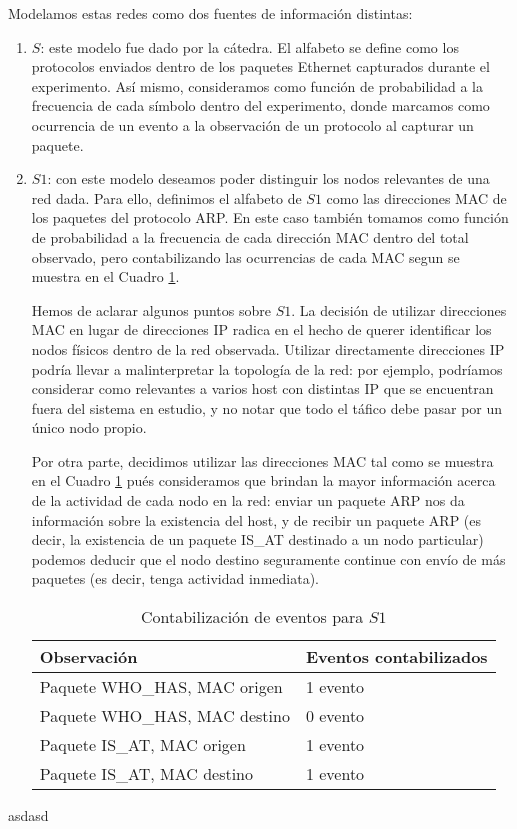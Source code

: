 Modelamos estas redes como dos fuentes de información distintas:
\begin{enumerate}
	\item $S$: este modelo fue dado por la cátedra. El alfabeto se define como los protocolos enviados dentro de los paquetes Ethernet capturados durante el experimento. Así mismo, consideramos como función de probabilidad a la frecuencia de cada símbolo dentro del experimento, donde marcamos como ocurrencia de un evento a la observación de un protocolo al capturar un paquete.
	\item $S1$: con este modelo deseamos poder distinguir los nodos relevantes de una red dada. Para ello, definimos el alfabeto de $S1$ como las direcciones MAC de los paquetes del protocolo ARP. En este caso también tomamos como función de probabilidad a la frecuencia de cada dirección MAC dentro del total observado, pero contabilizando las ocurrencias de cada MAC segun se muestra en el Cuadro \ref{ARP}.
	
Hemos de aclarar algunos puntos sobre $S1$. La decisión de utilizar direcciones MAC en lugar de direcciones IP radica en el hecho de querer identificar los nodos físicos dentro de la red observada. Utilizar directamente direcciones IP podría llevar a malinterpretar la topología de la red: por ejemplo, podríamos considerar como relevantes a varios host con distintas IP que se encuentran fuera del sistema en estudio, y no notar que todo el táfico debe pasar por un único nodo propio.

Por otra parte, decidimos utilizar las direcciones MAC tal como se muestra en el Cuadro \ref{ARP} pués consideramos que brindan la mayor información acerca de la actividad de cada nodo en la red: enviar un paquete ARP nos da información sobre la existencia del host, y de recibir un paquete ARP (es decir, la existencia de un paquete IS\_AT destinado a un nodo particular) podemos deducir que el nodo destino seguramente continue con envío de más paquetes (es decir, tenga actividad inmediata).

	
		\begin{table}
			\centering
		\begin{tabular}{l l}
				Observación & Eventos contabilizados \\
				\hline
				Paquete WHO\_HAS, MAC origen & 1 evento \\
				Paquete WHO\_HAS, MAC destino & 0 evento \\
				Paquete IS\_AT, MAC origen & 1 evento\\
				Paquete IS\_AT, MAC destino & 1 evento\\
		\end{tabular}
		\caption{Contabilización de eventos para $S1$}
		\label{ARP} 
		\end{table}
\end{enumerate}
asdasd

